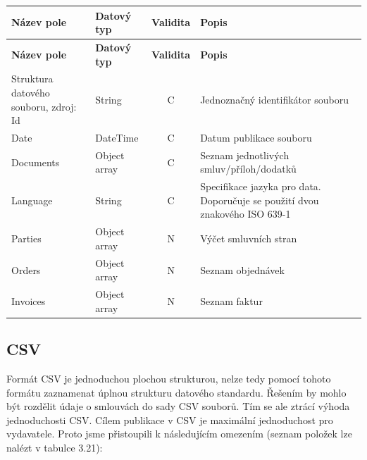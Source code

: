 \newpage

\begin{center}
\begin{longtable}{lp{20mm}cp{65mm}}
\label{grid_mlmmh} \\
\multicolumn{1}{l}{\textbf{Název pole}} & 
\multicolumn{1}{l}{\textbf{Datový typ}} & 
\multicolumn{1}{l}{\textbf{Validita}} & 
\multicolumn{1}{l}{\textbf{Popis}} \\ \hline 
\endfirsthead
\multicolumn{1}{l}{\textbf{Název pole}} & 
\multicolumn{1}{l}{\textbf{Datový typ}} & 
\multicolumn{1}{l}{\textbf{Validita}} & 
\multicolumn{1}{l}{\textbf{Popis}} \\ \hline 
\hline
\endhead
\endfoot
\caption{Struktura datového souboru, zdroj:\\\protect\cite{metodika}}
\endlastfoot
\rowcolor{validateC}Id & String & C & Jednoznačný identifikátor souboru \\
\rowcolor{validateC}Date & DateTime & C & Datum publikace souboru \\
\rowcolor{validateC}Documents & Object array & C & Seznam jednotlivých smluv/příloh/dodatků \\
\rowcolor{validateC}Language & String & C & Specifikace jazyka pro data. Doporučuje se použití dvou znakového ISO 639-1 \\
Parties & Object array & N & Výčet smluvních stran \\
Orders & Object array & N & Seznam objednávek \\
Invoices & Object array & N & Seznam faktur \\
\end{longtable}
\end{center}



\newpage

\subsection{CSV}

Formát CSV je jednoduchou plochou strukturou, nelze tedy pomocí tohoto formátu zaznamenat úplnou strukturu datového standardu. Řešením by mohlo být rozdělit údaje o smlouvách do sady CSV souborů. Tím se ale ztrácí výhoda jednoduchosti CSV. Cílem publikace v CSV je maximální jednoduchost pro vydavatele. Proto jsme přistoupili k následujícím omezením (seznam položek lze nalézt v tabulce 3.21):

